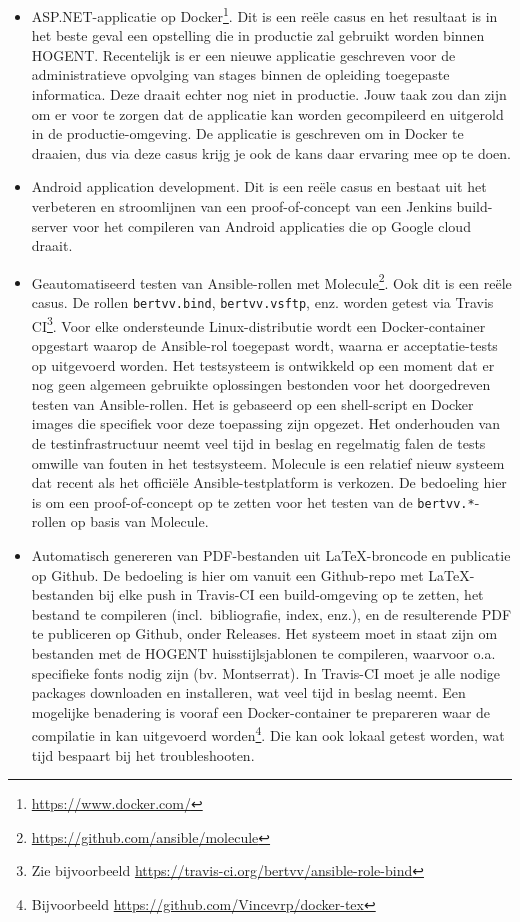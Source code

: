 \begin{itemize}
  \item ASP.NET-applicatie op Docker\footnote{\url{https://www.docker.com/}}. Dit is een reële casus en het resultaat is in het beste geval een opstelling die in productie zal gebruikt worden binnen HOGENT. Recentelijk is er een nieuwe applicatie geschreven voor de administratieve opvolging van stages binnen de opleiding toegepaste informatica. Deze draait echter nog niet in productie. Jouw taak zou dan zijn om er voor te zorgen dat de applicatie kan worden gecompileerd en uitgerold in de productie-omgeving. De applicatie is geschreven om in Docker te draaien, dus via deze casus krijg je ook de kans daar ervaring mee op te doen. 
  
  \item Android application development. Dit is een reële casus en bestaat uit het verbeteren en stroomlijnen van een proof-of-concept van een Jenkins build-server voor het compileren van Android applicaties die op Google cloud draait.
  
  \item Geautomatiseerd testen van Ansible-rollen met Molecule\footnote{\url{https://github.com/ansible/molecule}}. Ook dit is een reële casus. De rollen \texttt{bertvv.bind}, \texttt{bertvv.vsftp}, enz. worden getest via Travis CI\footnote{Zie bijvoorbeeld \url{https://travis-ci.org/bertvv/ansible-role-bind}}. Voor elke ondersteunde Linux-distributie wordt een Docker-container opgestart waarop de Ansible-rol toegepast wordt, waarna er acceptatie-tests op uitgevoerd worden. Het testsysteem is ontwikkeld op een moment dat er nog geen algemeen gebruikte oplossingen bestonden voor het doorgedreven testen van Ansible-rollen. Het is gebaseerd op een shell-script en Docker images die specifiek voor deze toepassing zijn opgezet. Het onderhouden van de testinfrastructuur neemt veel tijd in beslag en regelmatig falen de tests omwille van fouten in het testsysteem. Molecule is een relatief nieuw systeem dat recent als het officiële Ansible-testplatform is verkozen. De bedoeling hier is om een proof-of-concept op te zetten voor het testen van de \texttt{bertvv.*}-rollen op basis van Molecule.
  
  \item Automatisch genereren van PDF-bestanden uit \LaTeX{}-broncode en publicatie op Github. De bedoeling is hier om vanuit een Github-repo met \LaTeX-{}be\-stan\-den bij elke push in Travis-CI een build-omgeving op te zetten, het bestand te compileren (incl.~bibliografie, index, enz.), en de resulterende PDF te publiceren op Github, onder Releases. Het systeem moet in staat zijn om bestanden met de HOGENT huisstijlsjablonen te compileren, waarvoor o.a. specifieke fonts nodig zijn (bv. Montserrat). In Travis-CI moet je alle nodige packages downloaden en installeren, wat veel tijd in beslag neemt. Een mogelijke benadering is vooraf een Docker-container te prepareren waar de compilatie in kan uitgevoerd worden\footnote{Bijvoorbeeld \url{https://github.com/Vincevrp/docker-tex}}. Die kan ook lokaal getest worden, wat tijd bespaart bij het troubleshooten.


\end{itemize}
